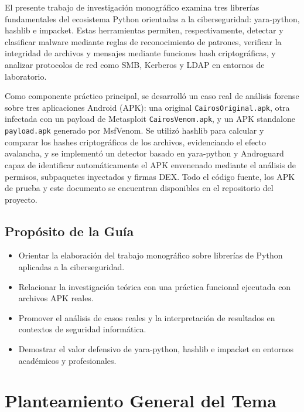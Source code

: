 \documentclass[12pt,a4paper]{article}
\begin{document}
El presente trabajo de investigación monográfico examina tres librerías
fundamentales del ecosistema Python orientadas a la ciberseguridad:
yara-python, hashlib e impacket. Estas herramientas permiten,
respectivamente, detectar y clasificar malware mediante reglas de
reconocimiento de patrones, verificar la integridad de archivos y
mensajes mediante funciones hash criptográficas, y analizar protocolos
de red como SMB, Kerberos y LDAP en entornos de laboratorio.

Como componente práctico principal, se desarrolló un caso real de
análisis forense sobre tres aplicaciones Android (APK): una original
\texttt{CairosOriginal.apk}, otra infectada con un payload de Metasploit
\texttt{CairosVenom.apk}, y un APK standalone \texttt{payload.apk}
generado por MsfVenom. Se utilizó hashlib para calcular y comparar los
hashes criptográficos de los archivos, evidenciando el efecto avalancha,
y se implementó un detector basado en yara-python y Androguard capaz de
identificar automáticamente el APK envenenado mediante el análisis de
permisos, subpaquetes inyectados y firmas DEX. Todo el código fuente,
los APK de prueba y este documento se encuentran disponibles en el
repositorio del proyecto.

\subsection{Propósito de la Guía}

\begin{itemize}
\item Orientar la elaboración del trabajo monográfico sobre librerías de
  Python aplicadas a la ciberseguridad.
\item Relacionar la investigación teórica con una práctica funcional
  ejecutada con archivos APK reales.
\item Promover el análisis de casos reales y la interpretación de resultados
  en contextos de seguridad informática.
\item Demostrar el valor defensivo de yara-python, hashlib e impacket en
  entornos académicos y profesionales.
\end{itemize}

\section{Planteamiento General del Tema}
\end{document}
